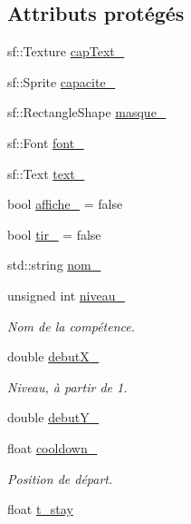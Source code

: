 \subsection*{Attributs protégés}
\begin{DoxyCompactItemize}
\item 
sf\+::\+Texture \hyperlink{class_capacite_ae2bb8ed749c9df4dbffcd37bf2760af8}{cap\+Text\+\_\+}
\item 
sf\+::\+Sprite \hyperlink{class_capacite_ab7087b64d553bdb520382c97dbcfdcbe}{capacite\+\_\+}
\item 
sf\+::\+Rectangle\+Shape \hyperlink{class_capacite_af256cf39048f6b10f6f7e81ba0f62432}{masque\+\_\+}
\item 
sf\+::\+Font \hyperlink{class_capacite_abb8abeff4070e7337cb8e42faa93c66f}{font\+\_\+}
\item 
sf\+::\+Text \hyperlink{class_capacite_ad76ace2cf7ece150cd533bba193e262b}{text\+\_\+}
\item 
bool \hyperlink{class_capacite_a8b566779d1926b5db0ed5ec4d8cd7891}{affiche\+\_\+} = false
\item 
bool \hyperlink{class_capacite_ae5318fb64d0def1069a9730c497d4bb6}{tir\+\_\+} = false
\item 
std\+::string \hyperlink{class_capacite_a430472b509233086cbad1d6d8332dc8c}{nom\+\_\+}
\item 
unsigned int \hyperlink{class_capacite_abf2ac63aa5928299c14581e681a16328}{niveau\+\_\+}
\begin{DoxyCompactList}\small\item\em Nom de la compétence. \end{DoxyCompactList}\item 
double \hyperlink{class_capacite_a4c0157dce9f9de52307d094be0af6d62}{debut\+X\+\_\+}
\begin{DoxyCompactList}\small\item\em Niveau, à partir de 1. \end{DoxyCompactList}\item 
double \hyperlink{class_capacite_a06dfbb349078ad8de25be378466c44d8}{debut\+Y\+\_\+}
\item 
float \hyperlink{class_capacite_aa84204be03602333d694faa14dbb693c}{cooldown\+\_\+}
\begin{DoxyCompactList}\small\item\em Position de départ. \end{DoxyCompactList}\item 
float \hyperlink{class_capacite_a23a2b453acba92c50694a3c682258ee9}{t\+\_\+stay}

\end{DoxyCompactItemize}
